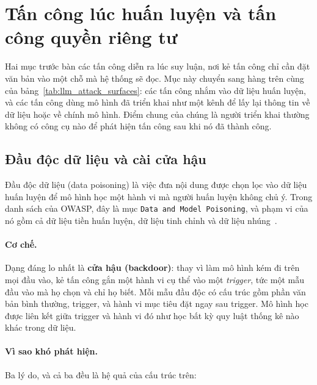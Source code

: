 
\section{Tấn công lúc huấn luyện và tấn công quyền riêng tư}
\label{sec:training_privacy_attacks}

Hai mục trước bàn các tấn công diễn ra lúc suy luận, nơi kẻ tấn công chỉ cần đặt văn bản vào một chỗ mà hệ thống sẽ đọc. Mục này chuyển sang hàng trên cùng của bảng~\ref{tab:llm_attack_surfaces}: các tấn công nhắm vào dữ liệu huấn luyện, và các tấn công dùng mô hình đã triển khai như một kênh để lấy lại thông tin về dữ liệu hoặc về chính mô hình. Điểm chung của chúng là người triển khai thường không có công cụ nào để phát hiện tấn công sau khi nó đã thành công.

\subsection{Đầu độc dữ liệu và cài cửa hậu}
\label{ssec:poisoning_backdoor}

Đầu độc dữ liệu (data poisoning) là việc đưa nội dung được chọn lọc vào dữ liệu huấn luyện để mô hình học một hành vi mà người huấn luyện không chủ ý. Trong danh sách của OWASP, đây là mục \texttt{Data and Model Poisoning}, và phạm vi của nó gồm cả dữ liệu tiền huấn luyện, dữ liệu tinh chỉnh và dữ liệu nhúng~\cite{owasp2025llmtop10}.

\paragraph{Cơ chế.} Dạng đáng lo nhất là \textbf{cửa hậu (backdoor)}: thay vì làm mô hình kém đi trên mọi đầu vào, kẻ tấn công gắn một hành vi cụ thể vào một \emph{trigger}, tức một mẫu đầu vào mà họ chọn và chỉ họ biết. Mỗi mẫu đầu độc có cấu trúc gồm phần văn bản bình thường, trigger, và hành vi mục tiêu đặt ngay sau trigger. Mô hình học được liên kết giữa trigger và hành vi đó như học bất kỳ quy luật thống kê nào khác trong dữ liệu.

\paragraph{Vì sao khó phát hiện.} Ba lý do, và cả ba đều là hệ quả của cấu trúc trên:

